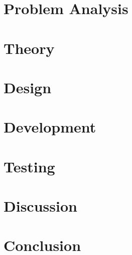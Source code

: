 



\chapter{Problem Analysis}
\label{chap:problem}







\chapter{Theory}
\label{theory}



\chapter{Design}
\label{design}




\chapter{Development}
\label{chap:development}
\chapter{Testing}
\label{testing}
\chapter{Discussion}
\label{discussion}
\chapter{Conclusion}
\label{conclusion}
\begingroup
	\raggedright
\endgroup

